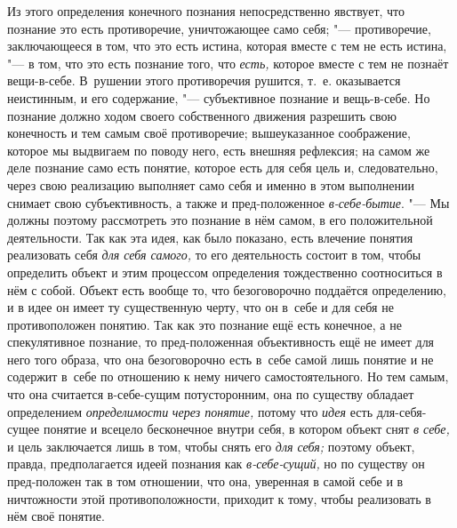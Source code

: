 Из этого определения конечного познания непосредственно
явствует, что познание это есть противоречие, уничтожающее само себя;
"--- противоречие, заключающееся в том, что это есть истина,
которая вместе с тем не есть истина, "--- в том, что это есть
познание того, что {\em есть,}
которое вместе с тем не познаёт вещи-в-себе. В~рушении этого
противоречия рушится, т.~е. оказывается неистинным, и его содержание, "---
субъективное познание и вещь-в-себе. Но познание должно ходом
своего собственного движения разрешить свою конечность и тем самым своё
противоречие; вышеуказанное соображение, которое мы выдвигаем по поводу
него, есть внешняя рефлексия; на самом же деле познание само есть понятие,
которое есть для себя цель и, следовательно, через свою реализацию
выполняет само себя и именно в этом выполнении снимает свою субъективность,
а также и пред-положенное
{\em в-себе-бытие}.
"--- Мы должны поэтому рассмотреть это познание в нём самом, в
его положительной деятельности. Так как эта идея, как было показано, есть
влечение понятия реализовать себя
{\em для себя самого,} то
его деятельность состоит в том, чтобы определить объект и этим процессом
определения тождественно соотноситься в нём с собой. Объект есть вообще то,
что безоговорочно поддаётся определению, и в идее он имеет ту существенную
черту, что он в~себе и для себя не противоположен понятию. Так как это
познание ещё есть конечное, а не спекулятивное познание, то пред-положенная
объективность ещё не имеет для него того образа, что она безоговорочно есть
в~себе самой лишь понятие и не содержит в~себе по отношению к нему ничего
самостоятельного. Но тем самым, что она считается в-себе-сущим
потусторонним, она по существу обладает определением
{\em определимости}
{\em через понятие,}
потому что {\em идея}
есть для-себя-сущее понятие и всецело бесконечное внутри
себя, в котором объект снят {\em в
себе,} и цель заключается лишь в том, чтобы снять его
{\em для себя;} поэтому
объект, правда, предполагается идеей познания как
{\em в-себе-сущий,} но по
существу он пред-положен так в том отношении, что она,
уверенная в самой себе и в ничтожности этой
противоположности, приходит к тому, чтобы реализовать в нём своё понятие.

